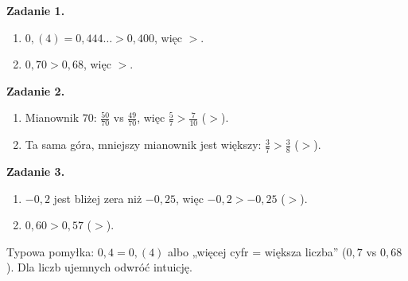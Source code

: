 \documentclass[11pt,a4paper]{article}
\begin{document}

\vspace{0.6em}
\textbf{Zadanie 1.}
\begin{enumerate}[label=\alph*), leftmargin=*, itemsep=4pt]
  \item $0{,}(4)=0{,}444\ldots>0{,}400$, więc \textbf{$>$}.
  \item $0{,}70>0{,}68$, więc \textbf{$>$}.
\end{enumerate}

\textbf{Zadanie 2.}
\begin{enumerate}[label=\alph*), leftmargin=*, itemsep=4pt]
  \item Mianownik $70$: $\frac{50}{70}$ vs $\frac{49}{70}$, więc $\frac{5}{7}>\frac{7}{10}$ (\textbf{$>$}).
  \item Ta sama góra, mniejszy mianownik jest większy: $\frac{3}{7}>\frac{3}{8}$ (\textbf{$>$}).
\end{enumerate}

\textbf{Zadanie 3.}
\begin{enumerate}[label=\alph*), leftmargin=*, itemsep=4pt]
  \item $-0{,}2$ jest bliżej zera niż $-0{,}25$, więc $-0{,}2>-0{,}25$ (\textbf{$>$}).
  \item $0{,}60>0{,}57$ (\textbf{$>$}).
\end{enumerate}

\vspace{0.6em}
\begin{tcolorbox}[colback=white, colframe=okres, boxrule=0.6pt, arc=2pt, title=Wskazówka dla Pawła]
Typowa pomyłka: $0{,}4=0{,}(4)$ albo „więcej cyfr = większa liczba” ($0{,}7$ vs $0{,}68$). Dla liczb ujemnych odwróć intuicję.
\end{tcolorbox}
\end{document}
